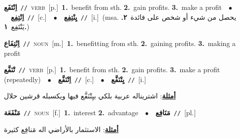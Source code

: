 \documentclass[10pt,a4paper,twoside]{article} %
\begin{document}
\begin{multicols}{2}
{\setlength\topsep{0pt}\textbf{\foreignlanguage{arabic}{اِنْتَفَع}}\ {\color{gray}\texttt{//}\color{black}}\ \textsc{verb}\ [p.]\ \textbf{1.}~benefit from sth.  \textbf{2.}~gain profits.  \textbf{3.}~make a profit\ \ $\bullet$\ \ \setlength\topsep{0pt}\textbf{\foreignlanguage{arabic}{اِنْتِفِع}}\ {\color{gray}\texttt{//}\color{black}}\ [c.]\ \ $\bullet$\ \ \setlength\topsep{0pt}\textbf{\foreignlanguage{arabic}{يِنْتِفِع}}\ {\color{gray}\texttt{//}\color{black}}\ [i.]\ \color{gray}(msa. \foreignlanguage{arabic}{يحصل من شيء أو شخص على فائدة}~\foreignlanguage{arabic}{\textbf{٢.}}  \foreignlanguage{arabic}{يَنْتَفِع}~\foreignlanguage{arabic}{\textbf{١.}})\color{black}\ } \vspace{2mm}

{\setlength\topsep{0pt}\textbf{\foreignlanguage{arabic}{اِنْتِفَاع}}\ {\color{gray}\texttt{//}\color{black}}\ \textsc{noun}\ [m.]\ \textbf{1.}~benefitting from sth.  \textbf{2.}~gaining profits.  \textbf{3.}~making a profit\ } \vspace{2mm}

{\setlength\topsep{0pt}\textbf{\foreignlanguage{arabic}{تْنَفَّع}}\ {\color{gray}\texttt{//}\color{black}}\ \textsc{verb}\ [p.]\ \textbf{1.}~benefit from sth.  \textbf{2.}~gain profits.  \textbf{3.}~make a profit (repeatedly)\ \ $\bullet$\ \ \setlength\topsep{0pt}\textbf{\foreignlanguage{arabic}{اِتْنَفَّع}}\ {\color{gray}\texttt{//}\color{black}}\ [c.]\ \ $\bullet$\ \ \setlength\topsep{0pt}\textbf{\foreignlanguage{arabic}{يِتْنَفَّع}}\ {\color{gray}\texttt{//}\color{black}}\ [i.]\  \begin{flushright}\color{gray}\foreignlanguage{arabic}{\textbf{\underline{\foreignlanguage{arabic}{أمثلة}}}: اشتريناله عربية بلكي بيِتْنَفَّع فيها ويكسبله قرشين حلال}\end{flushright}\color{black}} \vspace{2mm}

{\setlength\topsep{0pt}\textbf{\foreignlanguage{arabic}{مَنْفَعَة}}\ {\color{gray}\texttt{//}\color{black}}\ \textsc{noun}\ [f.]\ \textbf{1.}~interest  \textbf{2.}~advantage\ \ $\bullet$\ \ \setlength\topsep{0pt}\textbf{\foreignlanguage{arabic}{مَنَافِع}}\ {\color{gray}\texttt{//}\color{black}}\ [pl.]\  \begin{flushright}\color{gray}\foreignlanguage{arabic}{\textbf{\underline{\foreignlanguage{arabic}{أمثلة}}}: الاستثمار بالأراضي اله مَنافِع كثيرة}\end{flushright}\color{black}} \vspace{2mm}


\end{multicols}
\end{document}
